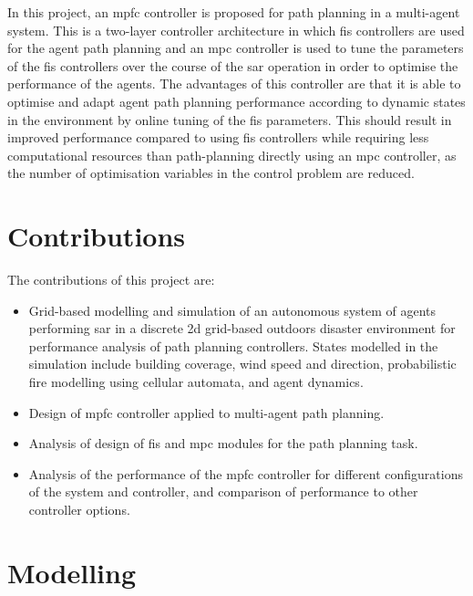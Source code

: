 \documentclass[conference]{IEEEtran}
\begin{document}
In this project, an \gls{mpfc} controller is proposed for path planning in a multi-agent system.
This is a two-layer controller architecture in which \gls{fis} controllers are used for the agent path planning and an \gls{mpc} controller is used to tune the parameters of the \gls{fis} controllers over the course of the \gls{sar} operation in order to optimise the performance of the agents.
The advantages of this controller are that it is able to optimise and adapt agent path planning performance according to dynamic states in the environment by online tuning of the \gls{fis} parameters.
This should result in improved performance compared to using \gls{fis} controllers while requiring less computational resources than path-planning directly using an \gls{mpc} controller, as the number of optimisation variables in the control problem are reduced.

\section{Contributions} \label{sec:contributions}

The contributions of this project are:

\begin{itemize}
    \item Grid-based modelling and simulation of an autonomous system of agents performing \gls{sar} in a discrete \gls{2d} grid-based outdoors disaster environment for performance analysis of path planning controllers.
    States modelled in the simulation include building coverage, wind speed and direction, probabilistic fire modelling using cellular automata, and agent dynamics.
    \item Design of \gls{mpfc} controller applied to multi-agent path planning.
    \item Analysis of design of \gls{fis} and \gls{mpc} modules for the path planning task.
    \item Analysis of the performance of the \gls{mpfc} controller for different configurations of the system and controller, and comparison of performance to other controller options.
\end{itemize}

\section{Modelling} \label{sec:modelling}
\end{document}
